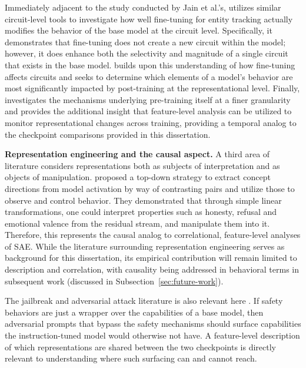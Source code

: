 Immediately adjacent to the study conducted by Jain et al.'s, \textcite{prakash_fine-tuning_2024} utilizes similar circuit-level tools to investigate how well fine-tuning for entity tracking actually modifies the behavior of the base model at the circuit level. Specifically, it demonstrates that fine-tuning does not create a new circuit within the model; however, it does enhance both the selectivity and magnitude of a single circuit that exists in the base model. \textcite{du_how_2025}  builds upon this understanding of how fine-tuning affects circuits and seeks to determine which elements of a model's behavior are most significantly impacted by post-training at the representational level. Finally, \textcite{xu_tracking_nodate} investigates the mechanisms underlying pre-training itself at a finer granularity and provides the additional insight that feature-level analysis can be utilized to monitor representational changes across training, providing a temporal analog to the checkpoint comparisons provided in this dissertation.

\textbf{Representation engineering and the causal aspect.} A third area of literature considers representations both as subjects of interpretation and as objects of manipulation. \textcite{zou_representation_2025} proposed a top-down strategy to extract concept directions from model activation by way of contrasting pairs and utilize those to observe and control behavior. They demonstrated that through simple linear transformations, one could interpret properties such as honesty, refusal and emotional valence from the residual stream, and manipulate them into it. Therefore, this represents the causal analog to correlational, feature-level analyses of SAE. While the literature surrounding representation engineering serves as background for this dissertation, its empirical contribution will remain limited to description and correlation, with causality being addressed in behavioral terms in subsequent work (discussed in Subsection~\ref{sec:future-work}).

The jailbreak and adversarial attack literature is also relevant here \parencite{zou_universal_2023, hubinger_sleeper_2024}. If safety behaviors are just a wrapper over the capabilities of a base model, then adversarial prompts that bypass the safety mechanisms should surface capabilities the instruction-tuned model would otherwise not have. A feature-level description of which representations are shared between the two checkpoints is directly relevant to understanding where such surfacing can and cannot reach.

